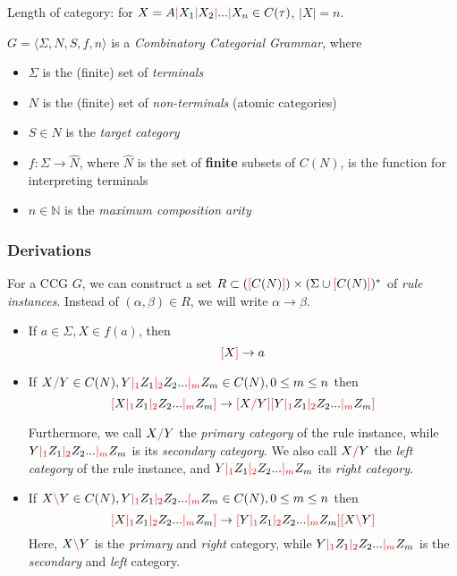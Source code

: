 \documentclass[main.tex]{subfiles}
\begin{document}
\begin{defn}
    Length of category: for $X = A \textcolor{red}{|} X_1 \textcolor{red}{|} X_2 \textcolor{red}{|} ... \textcolor{red}{|} X_n \in C(\tau)$,
    $|X| = n$.
\end{defn}

\begin{defn}
    $ G = \langle \Sigma, N, S, f, n \rangle $ is a \emph{Combinatory Categorial Grammar}, where
    \begin{itemize}
        \item $ \Sigma $ is the (finite) set of \emph{terminals}
        \item $ N $ is the (finite) set of \emph{non-terminals} (atomic categories)
        \item $ S \in N $ is the \emph{target category}
        \item $ f : \Sigma \rightarrow \hat{N} $, where $\hat{N}$ is the set of
            \textbf{finite} subsets of $C(N)$, is the function for interpreting
            terminals
        \item $ n \in \mathbb{N} $ is the \emph{maximum composition arity}
    \end{itemize}
\end{defn}

\subsubsection{Derivations}

\begin{defn}
    For a CCG $G$, we can construct a set $R \subset (\textcolor{red}{[} C(N) \textcolor{red}{]}) \times (\Sigma \cup \textcolor{red}{[} C(N) \textcolor{red}{]})^*$
    of \emph{rule instances}. Instead of $(\alpha, \beta) \in R$, we will write
    $\alpha \rightarrow \beta$.

    \begin{itemize}
        \item If $ a \in \Sigma, X \in f(a) $, then \[ \textcolor{red}{[} X \textcolor{red}{]} \rightarrow a \]
        \item If $ X \textcolor{red}{/} Y \in C(N), Y \textcolor{red}{|_{1}} Z_1 \textcolor{red}{|_{2}} Z_2 ... \textcolor{red}{|_{m}} Z_m \in C(N), 0 \leq m \leq n $
            then \[ \textcolor{red}{[} X \textcolor{red}{|_{1}} Z_1 \textcolor{red}{|_{2}} Z_2 ... \textcolor{red}{|_{m}} Z_m \textcolor{red}{]} \rightarrow \textcolor{red}{[} X \textcolor{red}{/} Y \textcolor{red}{]} \textcolor{red}{[} Y \textcolor{red}{|_{1}} Z_1 \textcolor{red}{|_{2}} Z_2 ... \textcolor{red}{|_{m}} Z_m \textcolor{red}{]} \]

            Furthermore, we call $ X \textcolor{red}{/} Y $ the \emph{primary category} of the rule
            instance, while $ Y \textcolor{red}{|_{1}} Z_1 \textcolor{red}{|_{2}} Z_2 ... \textcolor{red}{|_{m}} Z_m $ is its
            \emph{secondary category}.
            We also call $ X \textcolor{red}{/} Y $ the \emph{left category} of the rule instance,
            and $  Y \textcolor{red}{|_{1}} Z_1 \textcolor{red}{|_{2}} Z_2 ... \textcolor{red}{|_{m}} Z_m $ its \emph{right category}.
        \item If $ X \textcolor{red}{\backslash} Y \in C(N), Y \textcolor{red}{|_{1}} Z_1 \textcolor{red}{|_{2}} Z_2 ... \textcolor{red}{|_{m}} Z_m \in C(N), 0 \leq m \leq n $
            then \[ \textcolor{red}{[} X \textcolor{red}{|_{1}} Z_1 \textcolor{red}{|_{2}} Z_2 ... \textcolor{red}{|_{m}} Z_m \textcolor{red}{]} \rightarrow \textcolor{red}{[} Y \textcolor{red}{|_{1}} Z_1 \textcolor{red}{|_{2}} Z_2 ... \textcolor{red}{|_{m}} Z_m \textcolor{red}{]} \textcolor{red}{[} X \textcolor{red}{\backslash} Y \textcolor{red}{]} \]
            Here, $ X \textcolor{red}{\backslash} Y $ is the \emph{primary} and \emph{right} category,
            while $ Y \textcolor{red}{|_{1}} Z_1 \textcolor{red}{|_{2}} Z_2 ... \textcolor{red}{|_{m}} Z_m $ is the \emph{secondary}
            and \emph{left} category.
    \end{itemize}
\end{defn}
\end{document}
